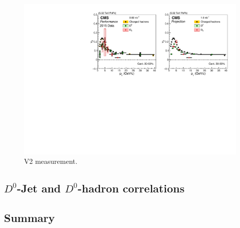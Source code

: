 \begin{figure}[!ht]
\begin{center}
\includegraphics[width=.90\textwidth]{figures/cV2_lumiMB_1.pdf}
\caption{V2 measurement.}
\label{fig:aj_2015}
\end{center}
\end{figure}



\subsection{$D^0$-Jet and $D^0$-hadron correlations}


\subsection{Summary}

